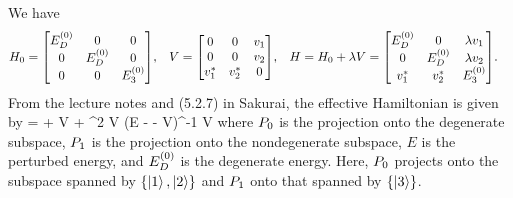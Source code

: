 \begin{solution}
	We have
	\begin{align*}
		\Ho &= \mqty[ \Eod & 0 & 0 \\ 0 & \Eod & 0 \\ 0 & 0 & \Eoe ], &
		V &= \mqty[ 0 & 0 & \vq \\ 0 & 0 & \vw \\ \vqs & \vws & 0 ], &
		H &= \Ho + \lam V = \mqty[ \Eod & 0 & \lam \vq \\ 0 & \Eod & \lam \vw \\ \vqs & \vws & \Eoe].
	\end{align*}
	From the lecture notes and (5.2.7) in Sakurai, the effective Hamiltonian is given by
	\beq
		\Heff = \Eod + \lam \Po V \Po + \lam^2 \Po V \Pq (E - \Ho - \lam V)^{-1} \Pq V \Po
	\eeq
	where $P_0$ is the projection onto the degenerate subspace, $P_1$ is the projection onto the nondegenerate subspace, $E$ is the perturbed energy, and $E^{(0)}_D$ is the degenerate energy.  Here, $P_0$ projects onto the subspace spanned by $\{ \ket{1}, \ket{2} \}$ and $P_1$ onto that spanned by $\{ \ket{3} \}$.
	

\end{solution}

